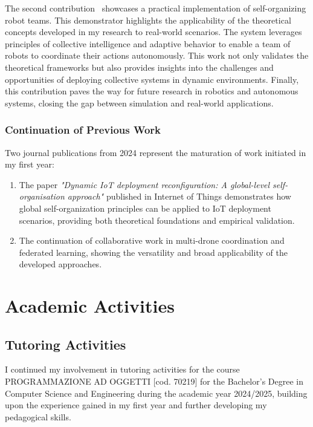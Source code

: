 \documentclass[runningheads]{llncs}
\begin{document}
The second contribution~\cite{DBLP:conf/coordination/AguzziBBCCDFPV25} showcases a practical implementation of self-organizing robot teams.
%
This demonstrator highlights the applicability of the theoretical concepts developed in my research to real-world scenarios.
%
The system leverages principles of collective intelligence and adaptive behavior to enable a team of robots to coordinate their actions autonomously.
%
This work not only validates the theoretical frameworks but also provides insights into the challenges and opportunities of deploying collective systems in dynamic environments.
%
Finally,
this contribution paves the way for future research in robotics and autonomous systems,
closing the gap between simulation and real-world applications.

\subsubsection{Continuation of Previous Work}

Two journal publications from 2024 represent the maturation of work initiated in my first year:

\begin{enumerate}
\item The paper \textit{"Dynamic IoT deployment reconfiguration: A global-level self-organisation approach"} published in Internet of Things demonstrates how global self-organization principles can be applied to IoT deployment scenarios, providing both theoretical foundations and empirical validation.

\item The continuation of collaborative work in multi-drone coordination and federated learning, showing the versatility and broad applicability of the developed approaches.
\end{enumerate}

\section{Academic Activities}

\subsection{Tutoring Activities}

I continued my involvement in tutoring activities for the course PROGRAMMAZIONE AD OGGETTI [cod. 70219] for the Bachelor's Degree in Computer Science and Engineering during the academic year 2024/2025, building upon the experience gained in my first year and further developing my pedagogical skills.
\end{document}
